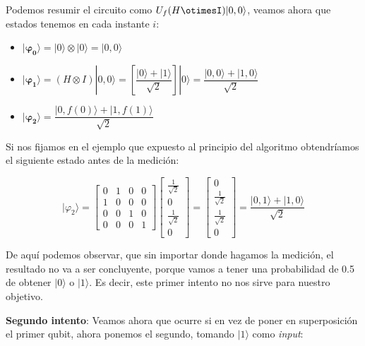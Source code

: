 Podemos resumir el circuito como  $U_{f}(H\otimesI)|0,0\rangle$, veamos ahora que estados tenemos en cada instante $i$:

\begin{itemize}
    \item $\mathbf{|\varphi_{0}\rangle} = |0\rangle \otimes |0\rangle = |0,0\rangle$

    \item $\mathbf{|\varphi_{1}\rangle} = (H\otimes I)|0,0\rangle = \left[ \dfrac{|0\rangle + |1\rangle}{\sqrt{2}}\right] |0\rangle = \dfrac{|0,0\rangle+|1,0\rangle}{\sqrt{2}}$

    \item  $\mathbf{|\varphi_{2}\rangle} = \dfrac{|0,f(0)\rangle+|1,f(1)\rangle}{\sqrt{2}}$
\end{itemize}

Si nos fijamos en el ejemplo que expuesto al principio del algoritmo obtendríamos el siguiente estado antes de la medición:

\begin{equation}
    |\varphi_{2}\rangle=\begin{bmatrix}
        0 & 1 & 0 & 0 \\
        1 & 0 & 0 & 0 \\
        0 & 0 & 1 & 0 \\
        0 & 0 & 0 & 1
    \end{bmatrix}
    \begin{bmatrix}
        \frac{1}{\sqrt{2}} \\ 0 \\ \frac{1}{\sqrt{2}} \\ 0 
    \end{bmatrix} = 
    \begin{bmatrix}
        0 \\ \frac{1}{\sqrt{2}} \\ \frac{1}{\sqrt{2}} \\ 0 
    \end{bmatrix} = \dfrac{|0,1\rangle + |1,0\rangle}{\sqrt{2}}
\end{equation}

De aquí podemos observar, que sin importar donde hagamos la medición, el resultado no va a ser concluyente, porque vamos a tener una probabilidad de 0.5 de obtener $|0\rangle$ o $|1\rangle$. Es decir, este primer intento no nos sirve para nuestro objetivo. \newline

\textbf{Segundo intento}: Veamos ahora que ocurre si en vez de poner en superposición el primer qubit, ahora ponemos el segundo, tomando $|1\rangle$ como \textit{input}:

